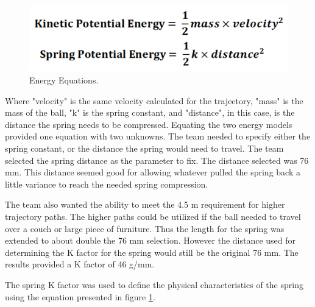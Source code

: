 \documentclass[11pt]{article}
\begin{document}
\begin{figure}[H]
    \centering
        \includegraphics[scale=.8, angle =0]{figures/Energy.PNG}
    \caption{Energy Equations.}
    \label{EE}
\end{figure}
Where "velocity" is the same velocity calculated for the trajectory, "mass" is the mass of the ball, "k" is the spring constant, and "distance", in this case, is the distance the spring needs to be compressed. Equating the two energy models provided one equation with two unknowns. The team needed to specify either the spring constant, or the distance the spring would need to travel. The team selected the spring distance as the parameter to fix. The distance selected was 76 mm. This distance seemed good for allowing whatever pulled the spring back a little variance to reach the needed spring compression.

The team also wanted the ability to meet the 4.5 m requirement for higher trajectory paths. The higher paths could be utilized if the ball needed to travel over a couch or large piece of furniture. Thus the length for the spring was extended to about double the 76 mm selection. However the distance used for determining the K factor for the spring would still be the original 76 mm. The results provided a K factor of 46 g/mm.

The spring K factor was used to define the physical characteristics of the spring using the equation presented in figure \ref{EE}. \cite{4}
\end{document}
